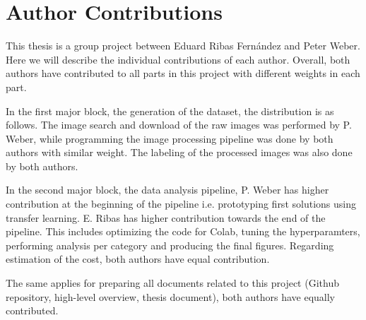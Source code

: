 
\chapter{Author Contributions} %

\label{Chapter7} %




This thesis is a group project between Eduard Ribas Fernández and Peter Weber. Here we will describe the individual contributions of each author. Overall, both authors have contributed to all parts in this project with different weights in each part.

In the first major block, the generation of the dataset, the distribution is as follows. The image search and download of the raw images was performed by P. Weber, while programming the image processing pipeline was done by both authors with similar weight. The labeling of the processed images was also done by both authors.

In the second major block, the data analysis pipeline, P. Weber has higher contribution at the beginning of the pipeline i.e. prototyping first solutions using transfer learning. E. Ribas has higher contribution towards the end of the pipeline. This includes optimizing the code for Colab, tuning the hyperparamters, performing analysis per category and producing the final figures.
Regarding estimation of the cost, both authors have equal contribution.

The same applies for preparing all documents related to this project (Github repository, high-level overview, thesis document), both authors have equally contributed.